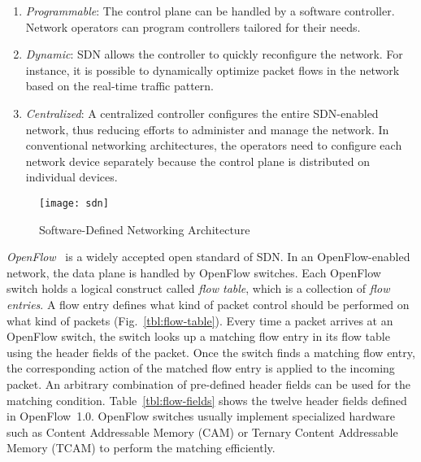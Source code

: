 \begin{enumerate}
\item
  \emph{Programmable}: The control plane can be handled by a software
  controller. Network operators can program controllers tailored for
  their needs.
\item
  \emph{Dynamic}: SDN allows the controller to quickly reconfigure the
  network. For instance, it is possible to dynamically optimize packet
  flows in the network based on the real-time traffic pattern.
\item
  \emph{Centralized}: A centralized controller configures the entire
  SDN-enabled network, thus reducing efforts to administer and manage
  the network. In conventional networking architectures, the operators
  need to configure each network device separately because the control
  plane is distributed on individual devices.
\end{enumerate}

\begin{figure}
    \centering
    \texttt{[image: sdn]}
    \caption{Software-Defined Networking Architecture}%
    \label{fig:sdn-architecture}
\end{figure}

\emph{OpenFlow}~\autocite{McKeown2008} is a widely accepted open standard of
SDN\@. In an OpenFlow-enabled network, the data plane is handled by OpenFlow
switches. Each OpenFlow switch holds a logical construct called \emph{flow
table}, which is a collection of \emph{flow entries}. A flow entry defines
what kind of packet control should be performed on what kind of packets
(Fig.~\ref{tbl:flow-table}). Every time a packet arrives at an OpenFlow
switch, the switch looks up a matching flow entry in its flow table using the
header fields of the packet. Once the switch finds a matching flow entry, the
corresponding action of the matched flow entry is applied to the incoming packet. An
arbitrary combination of pre-defined header fields can be used for the
matching condition. Table~\ref{tbl:flow-fields} shows the twelve header fields
defined in OpenFlow~1.0. OpenFlow switches usually implement specialized
hardware such as Content Addressable Memory (CAM) or Ternary Content
Addressable Memory (TCAM) to perform the matching efficiently.

